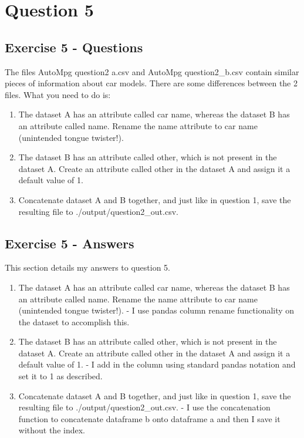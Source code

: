 \documentclass{scrreprt}
\begin{document}
	
	
	
\newpage
\chapter{Question 5}
\section{Exercise 5 - Questions}

The files AutoMpg question2 a.csv and AutoMpg question2\_b.csv contain similar pieces of information about car models. There are some differences between the 2 files. What you need to do is:
\begin{enumerate}
\item The dataset A has an attribute called car name, whereas the dataset B has an attribute called name. Rename the name attribute to car name (unintended tongue twister!).
\item The dataset B has an attribute called other, which is not present in the dataset A. Create an attribute called other in the dataset A and assign it a default value of 1.
\item Concatenate dataset A and B together, and just like in question 1, save the resulting file to ./output/question2\_out.csv.
\end{enumerate}


\section{Exercise 5 - Answers}
This section details my answers to question 5.
\begin{enumerate}
	\item The dataset A has an attribute called car name, whereas the dataset B has an attribute called name. Rename the name attribute to car name (unintended tongue twister!). - I use pandas column rename functionality on the dataset to accomplish this.
	\item The dataset B has an attribute called other, which is not present in the dataset A. Create an attribute called other in the dataset A and assign it a default value of 1. - I add in the column using standard pandas notation and set it to 1 as described.
	\item Concatenate dataset A and B together, and just like in question 1, save the resulting file to ./output/question2\_out.csv. - I use the concatenation function to concatenate dataframe b onto dataframe a and then I save it without the index.
\end{enumerate}


	
\end{document}
